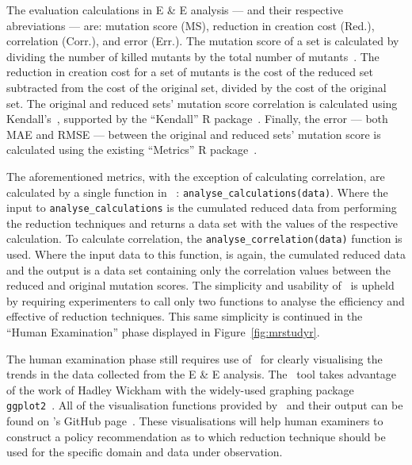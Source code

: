 The evaluation calculations in E \& E analysis --- and their respective abreviations --- are: mutation score
(MS), reduction in creation cost (Red.), correlation (Corr.), and error (Err.). The mutation score of a set is calculated
by dividing the number of killed mutants by the total number of mutants~\cite{wong1995reducing}. The reduction
in creation cost for a set of mutants is the cost of the reduced set subtracted from the cost of the original set,
divided by the cost of the original set. The original and reduced sets' mutation score correlation is calculated
using Kendall's~\taub, supported by the ``Kendall'' R package~\cite{mcleod2015kendall}. Finally, the error --- both
MAE and RMSE --- between the original and reduced sets' mutation score is calculated using the existing ``Metrics''
R package~\cite{metrics}.

The aforementioned metrics, with the exception of calculating correlation, are calculated by a single function in
\mr~: \texttt{analyse\_calculations(data)}. Where the input to \texttt{analyse\_calculations} is the cumulated reduced
data from performing the reduction techniques and returns a data set with the values of the respective calculation. To
calculate correlation, the \texttt{analyse\_correlation(data)} function is used. Where the input data to this function,
is again, the cumulated reduced data and the output is a data set containing only the correlation values between the
reduced and original mutation scores. The simplicity and usability of \mr~is upheld by requiring experimenters to call
only two functions to analyse the efficiency and effective of reduction techniques. This same simplicity is continued
in the ``Human Examination'' phase displayed in Figure~\ref{fig:mrstudyr}.


The human examination phase still requires use of \mr~for clearly visualising the trends in the data collected from
the E \& E analysis. The \mr~tool takes advantage of the work of Hadley Wickham with the widely-used graphing package
\texttt{ggplot2}~\cite{ggplot2}. All of the visualisation functions provided by \mr~and their output can be found on
\mr's GitHub page~\cite{tool}. These visualisations will help human examiners to construct a policy recommendation as
to which reduction technique should be used for the specific domain and data under observation.



